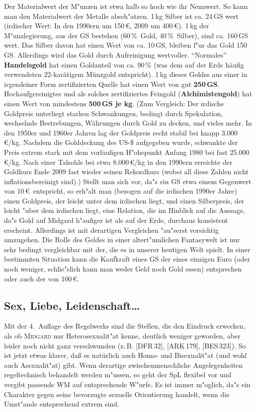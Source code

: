 \documentclass[10pt,a4paper,germanpar]{article}
\begin{document}
Der Materialwert der M"unzen ist etwa halb so hoch wie ihr Nennwert.
So kann man den Materialwert der Metalle absch"atzen. 1\,kg Silber ist
ca. 24\,GS wert (irdischer Wert: In den 1990ern um 150\,\euro, 2009 um
400\,\euro).  1\,kg der M"unzlegierung, aus der GS bestehen (60\,\%\
Gold, 40\,\%\ Silber), sind ca. 160\,GS wert. Das Silber davon hat
einen Wert von ca. 10\,GS, bleiben f"ur das Gold 150\,GS. Allerdings
wird das Gold durch Aufreinigung wertvoller. "`Normales"'
\textbf{Handelsgold} hat einen Goldanteil von ca. 90\,\% (was dem auf
der Erde häufig verwendeten 22-karätigem Münzgold entspricht). 1\,kg
dieses Goldes aus einer in irgendeiner Form zertifizierten Quelle hat
einen Wert von gut \textbf{250\,GS}. Hochaufgereinigtes und als
solches zertifiziertes Feingold (\textbf{Alchimistengold}) hat einen
Wert von mindestens \textbf{500\,GS je kg}. (Zum Vergleich: Der
irdische Goldpreis unterliegt starken Schwankungen, bedingt durch
Spekulation, wechselnde Bestrebungen, Währungen durch Gold zu decken,
und vieles mehr.  In den 1950er und 1960er Jahren lag der Goldpreis
recht stabil bei knapp 3.000\,\euro/kg. Nachdem die Golddeckung des
US-\$ aufgegeben wurde, schwankte der Preis extrem stark mit dem
vorläufigen H"ohepunkt Anfang 1980 bei fast 25.000\,\euro/kg. Nach
einer Talsohle bei etwa 8.000\,\euro/kg in den 1990ern erreichte der
Goldkurs Ende 2009 fast wieder seinen Rekordkurs (wobei all diese
Zahlen nicht inflationsbereinigt sind).) Stellt man sich vor, da"s ein
GS etwa einem Gegenwert von 10\,\euro\ entspricht, so erh"alt man
(bezogen auf die irdischen 1990er Jahre) einen Goldpreis, der leicht
unter dem irdischen liegt, und einen Silberpreis, der leicht "uber dem
irdischen liegt, eine Relation, die im Hinblick auf die Aussage, da"s
Gold auf Midgard h"aufiger ist als auf der Erde, durchaus
konsistent erscheint. Allerdings ist mit derartigen Vergleichen
"au"serst vorsichtig umzugehen. Die Rolle des Geldes in einer
altert"umlichen Fantasywelt ist nur sehr bedingt vergleichbar mit der,
die es in unserer heutigen Welt spielt. In einer bestimmten Situation
kann die Kaufkraft eines GS der eines einzigen Euro (oder noch
weniger, schlie"slich kann man weder Geld noch Gold essen) entsprechen
oder auch der von 100\,\euro.



\subsection{Sex, Liebe, Leidenschaft\dots}
Mit der 4.~Auflage des Regelwerks sind die Stellen, die den Eindruck erwecken,
als ob \textsc{Midgard} nur Heterosexualit"at kenne, deutlich weniger geworden,
aber leider noch nicht ganz verschwunden (z.\,B. [DFR\,32], [ARK\,179],
[BES\,323]). So ist jetzt etwas klarer, daß es natürlich auch Homo- und
Bisexualit"at (und wohl auch Asexualit"at) gibt. Wenn derartige
zwischenmenschliche Angelegenheiten regeltechnisch behandelt werden m"ussen,
so geht der SpL flexibel vor und vergibt passende WM auf entsprechende
W"urfe. Es ist immer m"oglich, da"s ein Charakter gegen seine bevorzugte
sexuelle Orientierung handelt, wenn die Umst"ande entsprechend extrem sind.
\end{document}
